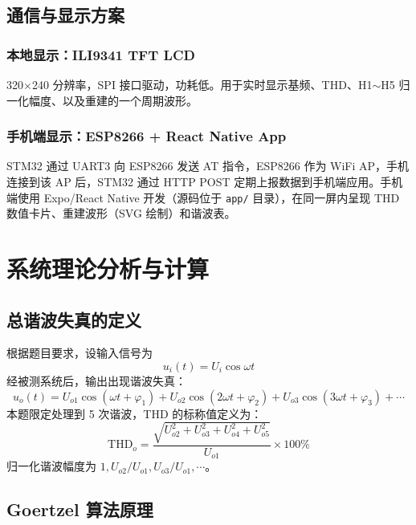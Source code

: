 \documentclass[a4paper]{article}
\begin{document}
	\subsection{通信与显示方案}

	\subsubsection{本地显示：ILI9341 TFT LCD}
	320$\times$240 分辨率，SPI 接口驱动，功耗低。用于实时显示基频、THD、H1$\sim$H5 归一化幅度、以及重建的一个周期波形。

	\subsubsection{手机端显示：ESP8266 + React Native App}
	STM32 通过 UART3 向 ESP8266 发送 AT 指令，ESP8266 作为 WiFi AP，手机连接到该 AP 后，STM32 通过 HTTP POST 定期上报数据到手机端应用。手机端使用 Expo/React Native 开发（源码位于 \texttt{app/} 目录），在同一屏内呈现 THD 数值卡片、重建波形（SVG 绘制）和谐波表。


	\newpage
	\section{系统理论分析与计算}

	\subsection{总谐波失真的定义}

	根据题目要求，设输入信号为
	\begin{equation}
		u_i(t) = U_i \cos \omega t
	\end{equation}
	经被测系统后，输出出现谐波失真：
	\begin{equation}
		u_o(t) = U_{o1} \cos(\omega t + \varphi_1) + U_{o2} \cos(2\omega t + \varphi_2) + U_{o3} \cos(3\omega t + \varphi_3) + \cdots
	\end{equation}
	本题限定处理到 5 次谐波，THD 的标称值定义为：
	\begin{equation}
		\mathrm{THD}_o = \frac{\sqrt{U_{o2}^2 + U_{o3}^2 + U_{o4}^2 + U_{o5}^2}}{U_{o1}} \times 100\%
		\label{eq:thd}
	\end{equation}
	归一化谐波幅度为 $1, U_{o2}/U_{o1}, U_{o3}/U_{o1}, \cdots$。

	\subsection{Goertzel 算法原理}
\end{document}

